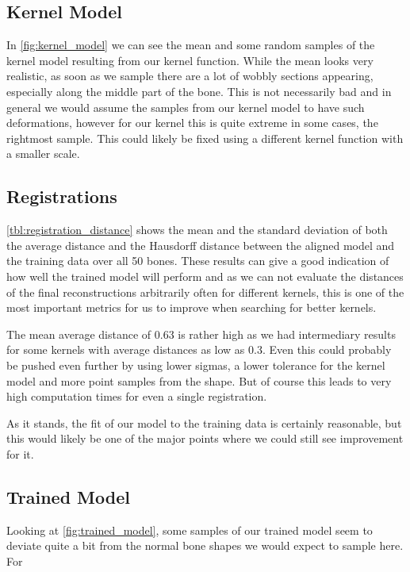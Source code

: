 \subsection{Kernel Model}
\label{subsec:kernmodeldisc}
In \autoref{fig:kernel_model} we can see the mean and some random samples of the kernel model resulting from our kernel function. While the mean looks very realistic, as soon as we sample there are a lot of wobbly sections appearing, especially along the middle part of the bone. This is not necessarily bad and in general we would assume the samples from our kernel model to have such deformations, however for our kernel this is quite extreme in some cases, \eg the rightmost sample. This could likely be fixed using a different kernel function with a smaller scale.


\subsection{Registrations}
\label{subsec:registrresultsdisc}
\autoref{tbl:registration_distance} shows the mean and the standard deviation of both the average distance and the Hausdorff distance between the aligned model and the training data over all 50 bones. These results can give a good indication of how well the trained model will perform and as we can not evaluate the distances of the final reconstructions arbitrarily often for different kernels, this is one of the most important metrics for us to improve when searching for better kernels.

The mean average distance of 0.63 is rather high as we had intermediary results for some kernels with average distances as low as 0.3. Even this could probably be pushed even further by using lower sigmas, a lower tolerance for the kernel model and more point samples from the shape. But of course this leads to very high computation times for even a single registration.

As it stands, the fit of our model to the training data is certainly reasonable, but this would likely be one of the major points where we could still see improvement for it.


\subsection{Trained Model}
\label{subsec:trainedmodeldisc}
Looking at \autoref{fig:trained_model}, some samples of our trained model seem to deviate quite a bit from the normal bone shapes we would expect to sample here. For 

